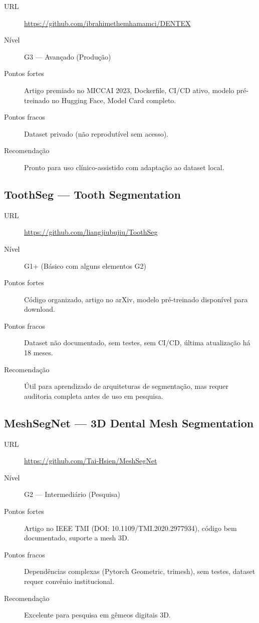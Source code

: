 \begin{description}
  \item[URL] \url{https://github.com/ibrahimethemhamamci/DENTEX}
  \item[Nível] G3 — Avançado (Produção)
  \item[Pontos fortes] Artigo premiado no MICCAI 2023, Dockerfile,
    CI/CD ativo, modelo pré-treinado no Hugging Face, Model Card completo.
  \item[Pontos fracos] Dataset privado (não reprodutível sem acesso).
  \item[Recomendação] Pronto para uso clínico-assistido com adaptação
    ao dataset local.
\end{description}

\subsection{ToothSeg — Tooth Segmentation}

\begin{description}
  \item[URL] \url{https://github.com/liangjiubujiu/ToothSeg}
  \item[Nível] G1+ (Básico com alguns elementos G2)
  \item[Pontos fortes] Código organizado, artigo no arXiv, modelo
    pré-treinado disponível para download.
  \item[Pontos fracos] Dataset não documentado, sem testes, sem CI/CD,
    última atualização há 18 meses.
  \item[Recomendação] Útil para aprendizado de arquiteturas de
    segmentação, mas requer auditoria completa antes de uso em pesquisa.
\end{description}

\subsection{MeshSegNet — 3D Dental Mesh Segmentation}

\begin{description}
  \item[URL] \url{https://github.com/Tai-Hsien/MeshSegNet}
  \item[Nível] G2 — Intermediário (Pesquisa)
  \item[Pontos fortes] Artigo no IEEE TMI (DOI: 10.1109/TMI.2020.2977934),
    código bem documentado, suporte a mesh 3D.
  \item[Pontos fracos] Dependências complexas (Pytorch Geometric, trimesh),
    sem testes, dataset requer convênio institucional.
  \item[Recomendação] Excelente para pesquisa em gêmeos digitais 3D.
\end{description}

